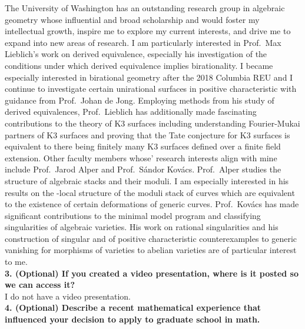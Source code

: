\documentclass[11pt]{article}
\begin{document}
The University of Washington has an outstanding research group in algebraic geometry whose influential and broad scholarship and would foster my intellectual growth, inspire me to explore my current interests, and drive me to expand into new areas of research. I am particularly interested in Prof.\ Max Lieblich’s work on derived equivalence, especially his investigation of the conditions under which derived equivalence implies birationality. I became especially interested in birational geometry after the 2018 Columbia REU and I continue to investigate certain unirational surfaces in positive characteristic with guidance from Prof.\ Johan de Jong. Employing methods from his study of derived equivalences, Prof.\ Lieblich has additionally made fascinating contributions to the theory of K3 surfaces including understanding Fourier-Mukai partners of K3 surfaces and proving that the Tate conjecture for K3 surfaces is equivalent to there being finitely many K3 surfaces defined over a finite field extension. Other faculty members whose’ research interests align with mine include Prof.\ Jarod Alper and Prof.\ S\'{a}ndor Kov\'{a}cs. Prof.\ Alper studies the structure of algebraic stacks and their moduli. I am especially interested in his results on the \etale-local structure of the moduli stack of curves which are equivalent to the existence of certain deformations of generic curves. Prof.\ Kov\'{a}cs has made significant contributions to the minimal model program and classifying singularities of algebraic varieties. His work on rational singularities and his construction of singular and of positive characteristic counterexamples to generic vanishing for morphisms of varieties to abelian varieties are of particular interest to me.
\bigskip\\
\noindent \textbf{3. (Optional) If you created a video presentation, where is it posted so we can access it?}
\bigskip\\
I do not have a video presentation.
\bigskip\\
\noindent \textbf{4. (Optional) Describe a recent mathematical experience that influenced your decision to apply to graduate school in math.}
\bigskip\\
\end{document}
